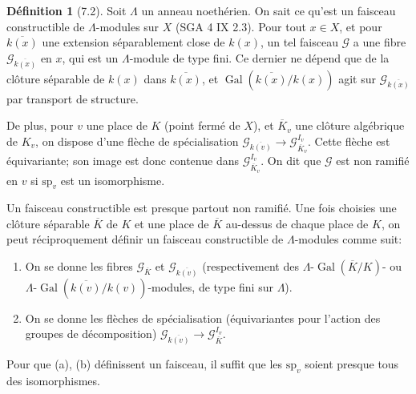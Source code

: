 \documentclass[11pt]{amsart}
\theoremstyle{plain}
\theoremstyle{definition}
\newtheorem{definition}[theorem]{D\'efinition}
\DeclareMathOperator{\Gal}{Gal}
\begin{document}
\begin{definition}[7.2]
Soit $\Lambda$ un anneau noeth\'erien. On sait ce qu'est un faisceau constructible de $\Lambda$-modules sur $X$ (SGA 4 IX 2.3). Pour tout $x \in X$, et pour $\overline{k(x)}$ une extension s\'eparablement close de $k(x)$, un tel faisceau $\mathcal{G}$ a une fibre $\mathcal{G}_{\overline{k(x)}}$ en $x$, qui est un $\Lambda$-module de type fini. Ce dernier ne d\'epend que de la cl\^oture s\'eparable de $k(x)$ dans $\overline{k(x)}$, et $\Gal(\overline{k(x)}/k(x))$ agit sur $\mathcal{G}_{\overline{k(x)}}$ par transport de structure.

De plus, pour $v$ une place de $K$ (point ferm\'e de $X$), et $\overline{K}_v$ une cl\^oture alg\'ebrique de $K_v$, on dispose d'une fl\`eche de sp\'ecialisation $\mathcal{G}_{\overline{k(v)}} \to \mathcal{G}_{\overline{K}_v}^{I_v}$. Cette fl\`eche est \'equivariante; son image est donc contenue dans $\mathcal{G}_{\overline{K}_v}^{I_v}$. On dit que $\mathcal{G}$ est non ramifi\'e en $v$ si $\mathrm{sp}_v$ est un isomorphisme.

Un faisceau constructible est presque partout non ramifi\'e. Une fois choisies une cl\^oture s\'eparable $\overline{K}$ de $K$ et une place de $\overline{K}$ au-dessus de chaque place de $K$, on peut r\'eciproquement d\'efinir un faisceau constructible de $\Lambda$-modules comme suit:
\begin{enumerate}
\item[(a)] On se donne les fibres $\mathcal{G}_{\overline{K}}$ et $\mathcal{G}_{\overline{k(v)}}$ (respectivement des $\Lambda$-$\Gal(\overline{K}/K)$- ou $\Lambda$-$\Gal(\overline{k(v)}/k(v))$-modules, de type fini sur $\Lambda$).
\item[(b)] On se donne les fl\`eches de sp\'ecialisation (\'equivariantes pour l'action des groupes de d\'ecomposition) $\mathcal{G}_{\overline{k(v)}} \to \mathcal{G}_{\overline{K}}^{I_v}$.
\end{enumerate}
Pour que (a), (b) d\'efinissent un faisceau, il suffit que les $\mathrm{sp}_v$ soient presque tous des isomorphismes.
\end{definition}
\end{document}
